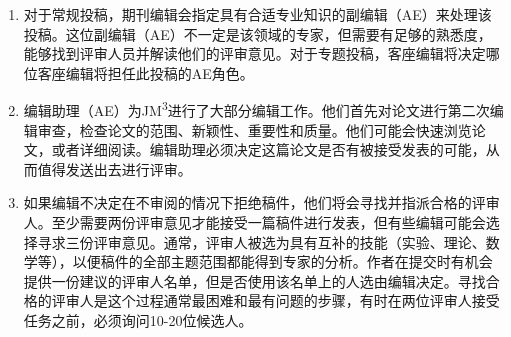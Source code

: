 \begin{enumerate}
\item 对于常规投稿，期刊编辑会指定具有合适专业知识的副编辑（AE）来处理该投稿。这位副编辑（AE）不一定是该领域的专家，但需要有足够的熟悉度，能够找到评审人员并解读他们的评审意见。对于专题投稿，客座编辑将决定哪位客座编辑将担任此投稿的AE角色。

\item 编辑助理（AE）为JM\textsuperscript{3}进行了大部分编辑工作。他们首先对论文进行第二次编辑审查，检查论文的范围、新颖性、重要性和质量。他们可能会快速浏览论文，或者详细阅读。编辑助理必须决定这篇论文是否有被接受发表的可能，从而值得发送出去进行评审。

\item 如果编辑不决定在不审阅的情况下拒绝稿件，他们将会寻找并指派合格的评审人。至少需要两份评审意见才能接受一篇稿件进行发表，但有些编辑可能会选择寻求三份评审意见。通常，评审人被选为具有互补的技能（实验、理论、数学等），以便稿件的全部主题范围都能得到专家的分析。作者在提交时有机会提供一份建议的评审人名单，但是否使用该名单上的人选由编辑决定。寻找合格的评审人是这个过程通常最困难和最有问题的步骤，有时在两位评审人接受任务之前，必须询问10-20位候选人。


\end{enumerate}
